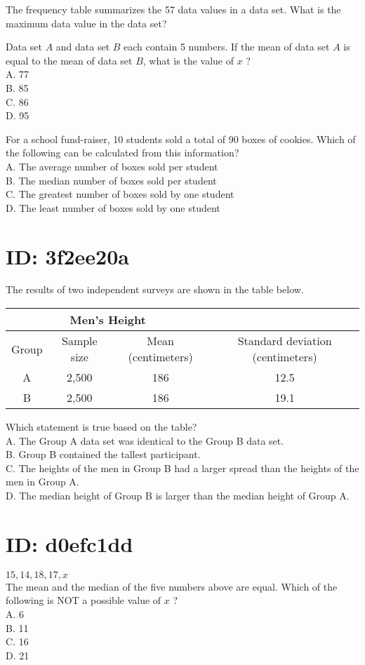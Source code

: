 The frequency table summarizes the 57 data values in a data set. What is the maximum data value in the data set?

Data set $A$ and data set $B$ each contain 5 numbers. If the mean of data set $A$ is equal to the mean of data set $B$, what is the value of $x$ ?\\
A. 77\\
B. 85\\
C. 86\\
D. 95

For a school fund-raiser, 10 students sold a total of 90 boxes of cookies. Which of the following can be calculated from this information?\\
A. The average number of boxes sold per student\\
B. The median number of boxes sold per student\\
C. The greatest number of boxes sold by one student\\
D. The least number of boxes sold by one student

\section*{ID: 3f2ee20a}
The results of two independent surveys are shown in the table below.

\begin{center}
\begin{tabular}{|c|c|c|c|}
\multicolumn{3}{c}{Men's Height} &  \\
\hline
Group & Sample size & Mean (centimeters) & Standard deviation (centimeters) \\
\hline
A & 2,500 & 186 & 12.5 \\
\hline
B & 2,500 & 186 & 19.1 \\
\hline
\end{tabular}
\end{center}

Which statement is true based on the table?\\
A. The Group A data set was identical to the Group B data set.\\
B. Group B contained the tallest participant.\\
C. The heights of the men in Group B had a larger spread than the heights of the men in Group A.\\
D. The median height of Group B is larger than the median height of Group A.

\section*{ID: d0efc1dd}
$15,14,18,17, x$\\
The mean and the median of the five numbers above are equal. Which of the following is NOT a possible value of $x$ ?\\
A. 6\\
B. 11\\
C. 16\\
D. 21

